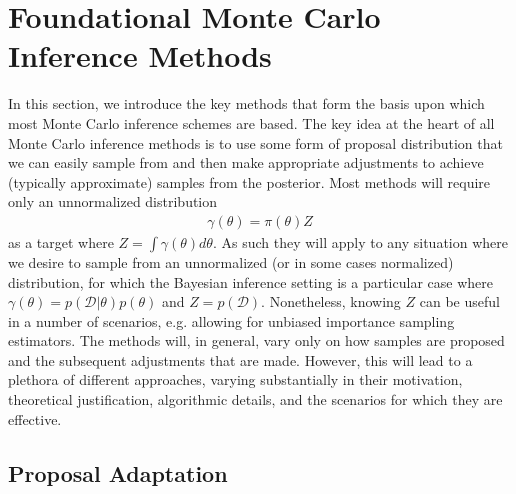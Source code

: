 
\section{Foundational Monte Carlo Inference Methods}
\label{sec:inf:foundation}

In this section, we introduce the key methods that form
the basis upon which most Monte Carlo inference schemes are based.  The
key idea at the heart of all Monte Carlo inference methods is to use some form
of proposal distribution that we can easily sample from and then make
appropriate adjustments to achieve (typically approximate) samples from
the posterior.  Most methods will require only an unnormalized distribution
\begin{align}
\label{eq:inf:unnorm-target}
\gamma(\theta) = \pi(\theta)Z
\end{align}
as a target where $Z = \int \gamma(\theta) d\theta$.  As such they will apply to
any situation where we desire to sample from an unnormalized 
(or in some cases normalized) distribution, for which
the Bayesian inference setting is a particular case where
$\gamma(\theta) = p(\mathcal{D}|\theta)p(\theta)$ and $Z = p(\mathcal{D})$.
Nonetheless, knowing $Z$ can be useful in a number of scenarios, e.g. allowing
for unbiased importance sampling estimators.
The methods will, in general, vary only on how samples are proposed
and the subsequent adjustments that are made.  However, this will lead to a
plethora of different approaches, varying substantially in their motivation,
theoretical justification, algorithmic details, and the scenarios for which they
are effective.






\subsection{Proposal Adaptation}
\label{sec:inf:proposal-adapt}

